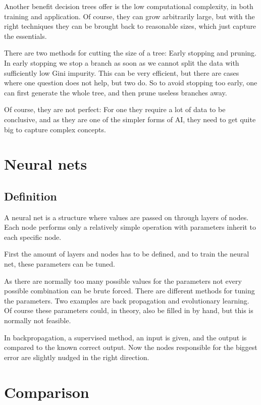 Another benefit decision trees offer is the low computational complexity, in both training and application. Of course, they can grow arbitrarily large, but with the right techniques %
they can be brought back to reasonable sizes, which just capture the essentials.

There are two methods for cutting the size of a tree: Early stopping and pruning. In early stopping we stop a branch as soon as we cannot split the data with sufficiently low Gini impurity. This can be very efficient, but there are cases where one question does not help, but two do. 
So to avoid stopping too early, one can first generate the whole tree, and then prune useless branches away.

Of course, they are not perfect: For one they require a lot of data to be conclusive, and as they are one of the simpler forms of AI, they need to get quite big to capture complex concepts.

\section{Neural nets}
\subsection{Definition}
A neural net is a structure where values are passed on through layers of nodes. Each node performs only a relatively simple operation with parameters inherit to each specific node.

First the amount of layers and nodes has to be defined, and to train the neural net, these parameters can be tuned.

As there are normally too many possible values for the parameters not every possible combination can be brute forced. There are different methods for tuning the parameters. Two examples are back propagation and evolutionary learning. Of course these parameters could, in theory, also be filled in by hand, but this is normally not feasible.

In backpropagation, a supervised method, an input is given, and the output is compared to the known correct output. Now the nodes responsible for the biggest error are slightly nudged in the right direction.

\section{Comparison}
